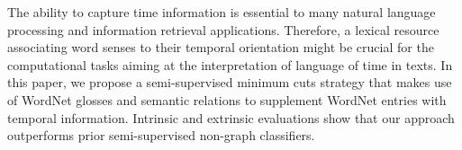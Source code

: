 The ability to capture time information is essential to many natural language processing and information retrieval applications. Therefore, a lexical resource associating word senses to their temporal orientation might be crucial for the computational tasks aiming at the interpretation of language of time in texts. In this paper, we propose a semi-supervised minimum cuts strategy that makes use of WordNet glosses and semantic relations to supplement WordNet entries with temporal information. Intrinsic and extrinsic evaluations show that our approach outperforms prior semi-supervised non-graph classifiers.
